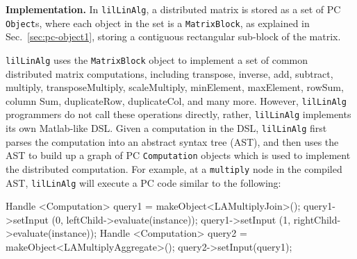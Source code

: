 \vspace{5pt}
\noindent
\textbf{Implementation.} In \texttt{lilLinAlg}, a distributed matrix is stored as a set of PC \texttt{Object}s, where each 
object in the set is a \texttt{MatrixBlock}, as explained in
Sec.~\ref{sec:pc-object1}, storing a contiguous rectangular sub-block of the matrix.


\texttt{lilLinAlg} uses the \texttt{MatrixBlock} object to implement a set of common distributed matrix
computations, including transpose,
inverse, add, subtract, multiply, transposeMultiply, 
scaleMultiply, minElement,
maxElement, rowSum, column Sum, duplicateRow, duplicateCol, 
and many more.  However, \texttt{lilLinAlg} programmers do not call these operations directly, rather,
\texttt{lilLinAlg} implements its own Matlab-like DSL.  
Given a computation in the DSL, \texttt{lilLinAlg} first parses the computation into an abstract syntax tree (AST), and then
uses the AST to build up a graph of PC \texttt{Computation} objects which is used to implement the distributed computation.
For example, at a \texttt{multiply} node in the compiled AST, \texttt{lilLinAlg} 
will execute a PC code similar to the following:

\begin{codesmall}
Handle <Computation> query1 = makeObject<LAMultiplyJoin>();
query1->setInput (0, leftChild->evaluate(instance));
query1->setInput (1, rightChild->evaluate(instance));
Handle <Computation> query2 = 
  makeObject<LAMultiplyAggregate>();
query2->setInput(query1);
\end{codesmall}

